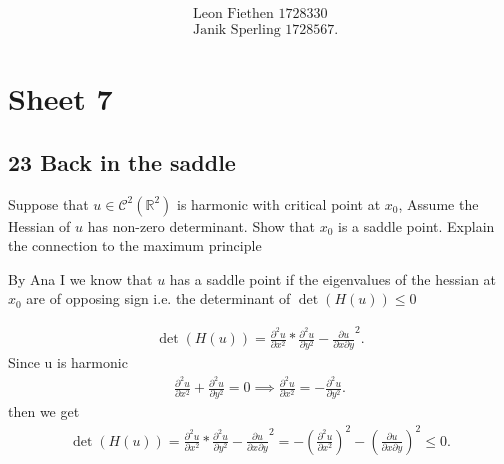 
\begin{align*}
  &\text{Leon Fiethen 1728330}\\
 &\text{Janik Sperling 1728567}
.\end{align*}
\section*{Sheet 7}
\subsection*{23 Back in the saddle}
\begin{question}
Suppose that $u \in  \mathcal{C}^2(\mathbb{R}^{2} )$ is harmonic with 
critical point at $x_{0}$, Assume the Hessian of $u$ has non-zero determinant. Show 
that $x_{0}$ is a saddle point. Explain the connection
to the maximum principle  
\end{question}
By Ana I we know that $u$ has a saddle point if the eigenvalues of the hessian at $x_{0}$ are of opposing sign i.e.
the determinant of $\det(H(u))\le 0$
\begin{solution}
  \begin{align*}
    \det(H(u))  =  \frac{\partial ^2 u}{\partial x^2}*\frac{\partial ^2 u}{\partial y^2} - \frac{\partial u}{\partial x \partial y}^2
  .\end{align*}
  Since u is harmonic
  \begin{align*}
   \frac{\partial ^2 u }{\partial x^2} + \frac{\partial ^2 u }{\partial y ^2}  = 0 \implies \frac{\partial ^2 u }{\partial x^2} = -\frac{\partial ^2 u }{\partial y ^2}
  .\end{align*}
  then we get 
  \begin{align*}
    \det(H(u)) =   \frac{\partial ^2 u}{\partial x^2}*\frac{\partial ^2 u}{\partial y^2} - \frac{\partial u}{\partial x \partial y}^2 = - (\frac{\partial ^2 u}{\partial x^2})^2 -  (\frac{\partial u}{\partial x \partial y})^2  \le 0
  .\end{align*}
\end{solution}
\newpage
